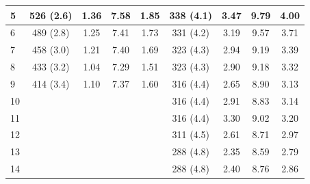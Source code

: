 \begin{table}[]
\begin{tabular}{|l|c|c|c|c|c|c|c|c|}
5                                     & 526 (2.6)         & 1.36                & 7.58              & 1.85                  & 338 (4.1)         & 3.47                & 9.79              & 4.00                  \\ \hline
6                                     & 489 (2.8)         & 1.25                & 7.41              & 1.73                  & 331 (4.2)         & 3.19                & 9.57              & 3.71                  \\ \hline
7                                     & 458 (3.0)         & 1.21                & 7.40              & 1.69                  & 323 (4.3)         & 2.94                & 9.19              & 3.39                  \\ \hline
8                                     & 433 (3.2)         & 1.04                & 7.29              & 1.51                  & 323 (4.3)         & 2.90                & 9.18              & 3.32                  \\ \hline
9                                     & 414 (3.4)         & 1.10                & 7.37              & 1.60                  & 316 (4.4)         & 2.65                & 8.90              & 3.13                  \\ \hline
10                                    &                   &                     &                   &                       & 316 (4.4)         & 2.91                & 8.83              & 3.14                  \\ \hline
11                                    &                   &                     &                   &                       & 316 (4.4)         & 3.30                & 9.02              & 3.20                  \\ \hline
12                                    &                   &                     &                   &                       & 311 (4.5)         & 2.61                & 8.71              & 2.97                  \\ \hline
13                                    &                   &                     &                   &                       & 288 (4.8)         & 2.35                & 8.59              & 2.79                  \\ \hline
14                                    &                   &                     &                   &                       & 288 (4.8)         & 2.40                & 8.76              & 2.86                  \\ \hline

\end{tabular}
\end{table}
